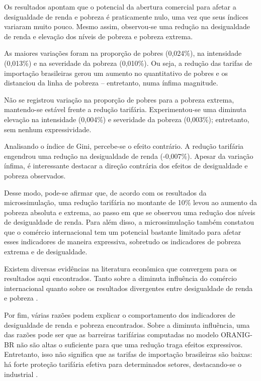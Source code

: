 Os resultados apontam que o potencial da abertura comercial para afetar a desigualdade de renda e pobreza é praticamente nulo, uma vez que seus índices variaram muito pouco. Mesmo assim, observou-se uma redução na desigualdade de renda e elevação dos níveis de pobreza e pobreza extrema.

As maiores variações foram na proporção de pobres (0,024\%), na intensidade (0,013\%) e na severidade da pobreza (0,010\%). Ou seja, a redução das tarifas de importação brasileiras gerou um aumento no quantitativo de pobres e os distanciou da linha de pobreza -- entretanto, numa ínfima magnitude. 

Não se registrou variação na proporção de pobres para a pobreza extrema, mantendo-se estável frente a redução tarifária. Experimentou-se uma diminuta elevação na intensidade (0,004\%) e severidade da pobreza (0,003\%); entretanto, sem nenhum expressividade.

Analisando o índice de Gini, percebe-se o efeito contrário. A redução tarifária engendrou uma redução na desigualdade de renda (-0,007\%). Apesar da variação ínfima, é interessante destacar a direção contrária dos efeitos de desigualdade e pobreza observados.

Desse modo, pode-se afirmar que, de acordo com os resultados da microssimulação, uma redução tarifária no montante de 10\% levou ao aumento da pobreza absoluta e extrema, ao passo em que se observou uma redução dos níveis de desigualdade de renda. Para além disso, a microssimulação também constatou que o comércio internacional tem um potencial bastante limitado para afetar esses indicadores de maneira expressiva, sobretudo os indicadores de pobreza extrema e de desigualdade.

Existem diversas evidências na literatura econômica que convergem para os resultados aqui encontrados. Tanto sobre a diminuta influência do comércio internacional \cite{carneiro06, anderson20} quanto sobre os resultados divergentes entre desigualdade de renda e pobreza \cite{borrazetal12,castilho12}.

Por fim, várias razões podem explicar o comportamento dos indicadores de desigualdade de renda e pobreza encontrados. Sobre a diminuta influência, uma das razões pode ser que as barreiras tarifárias computadas no modelo ORANIG-BR não são altas o suficiente para que uma redução traga efeitos expressivos. Entretanto, isso não significa que as tarifas de importação brasileiras são baixas: há forte proteção tarifária efetiva para determinados setores, destacando-se o industrial \cite{bloch18}.

